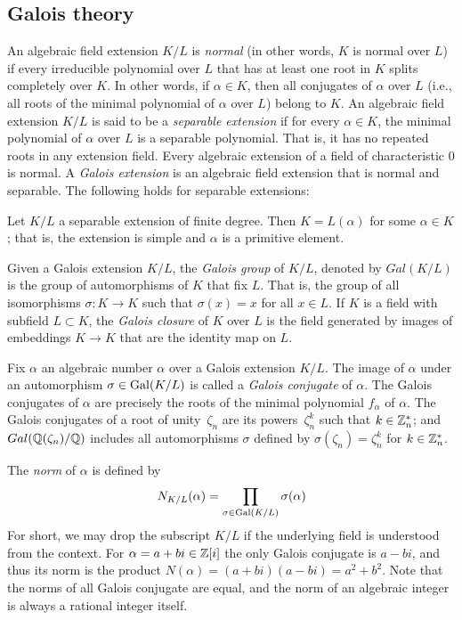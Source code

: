  \subsection{Galois theory}

An algebraic field extension $K/L$ is \emph{normal} (in other words, $K$ is normal over $L$) if every irreducible polynomial over $L$ that has at least one root in $K$ splits completely over $K$. In other words, if $\alpha\in K$, then all conjugates of $\alpha$ over $L$ (i.e., all roots of the minimal polynomial of $\alpha$ over $L$) belong to $K$.  An algebraic field extension $K/L$ is said to be a \emph{separable extension} if for every $\alpha\in K$, the minimal polynomial of $\alpha$ over $L$ is a separable polynomial. That is, it has no repeated roots in any extension field. Every algebraic extension of a field of characteristic 0 is normal. A \emph{Galois extension} is an algebraic field extension that is normal and separable. The following holds for separable extensions:

\begin{theorem}
\label{th:primitive_element}
Let $K/L$ a separable extension of finite degree. Then $K = L(\alpha)$ for some $\alpha \in K$; that is, the extension is simple and $\alpha$ is a primitive element. 
\end{theorem}
 
Given a Galois extension $K/L$, the \emph{Galois group} of $K/L$, denoted by $Gal(K/L)$ is the group of automorphisms of $K$ that fix $L$. That is, the group of all isomorphisms $\sigma: K \to K$ such that $\sigma(x) = x $ for all $x \in L$.
If $K$ is a field with subfield $L\subset K$, the \emph{Galois closure} of $K$ over $L$ is the field generated by images of embeddings $K \to K$ that are the identity map on $L$.

Fix $\alpha$ an algebraic number $\alpha$ over a Galois extension $K/L$.
The image of $\alpha$ under an automorphism $\sigma\in \operatorname{Gal}(K/L)$ is called a \emph{Galois conjugate} of $\alpha$. The Galois conjugates of $\alpha$  are precisely the roots of the minimal polynomial $f_\alpha$ of $\alpha$. 
The Galois conjugates of a root of unity~$\zeta_n$ are its powers~$\zeta^k_n$ such that $k\in \mathbb{Z}^{*}_n$; and $Gal(\mathbb{Q}(\zeta_n)/\mathbb{Q})$ includes all automorphisms $\sigma$ defined by $\sigma(\zeta_n) = \zeta_n^k$ for  $k\in \mathbb{Z}^*_n$.



The \emph{norm} of $\alpha$ is defined by
\[ N_{K/L}(\alpha) = \prod_{\sigma \in \operatorname{Gal}(K/L)} \sigma(\alpha)\]
For short, we may drop the subscript $K/L$ if the underlying field is understood from the
context. 
For $\alpha = a + bi \in\mathbb{Z}[i]$ the only Galois conjugate is $a - bi$, and thus  its norm is the product
$N(\alpha) = (a + bi)(a - bi) = a^2 + b^2$. Note that the norms of all Galois conjugate are equal, and the norm of an algebraic integer is always a rational integer itself.

